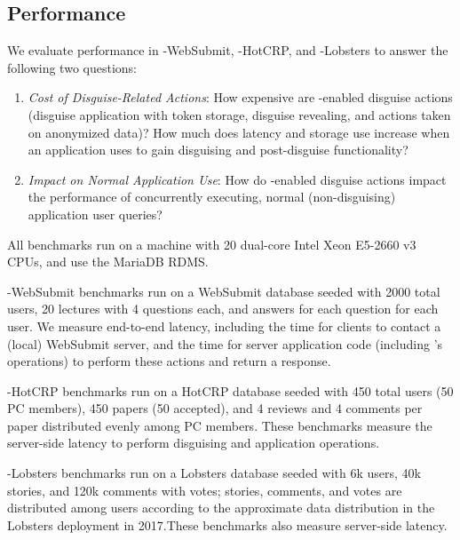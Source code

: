 \subsection{Performance}

We evaluate performance in \sys-WebSubmit, \sys-HotCRP, and \sys-Lobsters to answer the
following two questions:
\begin{enumerate}
\item \emph{Cost of Disguise-Related Actions}: How expensive are \sys-enabled disguise actions
(disguise application with token storage, disguise revealing, and actions taken on anonymized data)?
How much does latency and storage use increase when an application uses \sys to gain disguising and post-disguise functionality?
\item \emph{Impact on Normal Application Use}: How do \sys-enabled disguise actions impact the
    performance of concurrently executing, normal (non-disguising) application user queries?
\end{enumerate}

All benchmarks run on a machine with 20 dual-core Intel Xeon E5-2660 v3 CPUs, and use the MariaDB
RDMS.

\sys-WebSubmit benchmarks run on a WebSubmit database seeded with 2000 total users, 20
lectures with 4 questions each, and answers for each question for each user.  We measure end-to-end
latency, including the time for clients to contact a (local) WebSubmit server, and the time for
server application code (including \sys's operations) to perform these actions and return a
response.

\sys-HotCRP benchmarks run on a HotCRP database seeded with 450 total users (50 PC members),
450 papers (50 accepted), and 4 reviews and 4 comments per paper distributed evenly among PC
members. These benchmarks measure the server-side latency to perform disguising and application
operations.

\sys-Lobsters benchmarks run on a Lobsters database seeded with 6k users, 40k stories, and 120k
comments with votes; stories, comments, and votes are distributed among users according to the
approximate data distribution in the Lobsters deployment in 2017.These benchmarks also
measure server-side latency.

